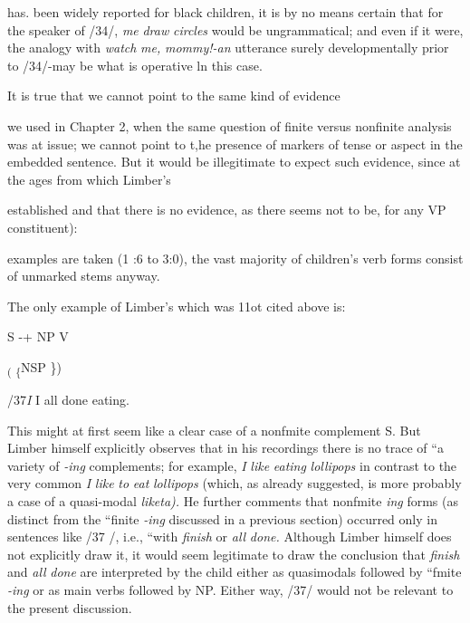 has. been widely reported for black children, it is by no means certain that for the speaker of /34/, \textit{me} \textit{draw} \textit{circles} would be ungrammatical; and even if it were, the analogy with \textit{watch} \textit{me,} \textit{mommy!-an} utterance surely developmentally prior to /34/-may be what is operative ln this case.

It is true that we cannot point to the same kind of evidence


we used in Chapter 2, when the same question of finite versus non\-finite analysis was at issue; we cannot point to t,he presence of markers of tense or aspect in the embedded sentence. But it would be illegiti\-mate to expect such evidence, since at the ages from which Limber's


established and that there is no evidence, as there seems not to be, for any VP constituent):

examples are taken (1 :6 to 3:0), the vast majority of children's verb forms consist of unmarked stems anyway.

The only example of Limber's which was 11ot cited above is:

\ea\label{ex:39}
 S {}-+ NP V
\glt
\z

\textsubscript{( }\textsubscript{\{}NSP \})

/37\textit{I} I all done eating.

This might at first seem like a clear case of a nonf{\textquotedbl}mite complement S. But Limber himself explicitly observes that in his recordings there is no trace of ``a variety of \textit{{}-ing} complements; for example, \textit{I} \textit{like} \textit{eating} \textit{lollipops} in contrast to the very common \textit{I} \textit{like} \textit{to} \textit{eat} \textit{lollipops{\textquotedbl}} (which, as already suggested, is more probably a case of a quasi-modal \textit{liketa).} He further comments that nonf{\textquotedbl}mite \textit{i}\textit{n}\textit{g} forms (as distinct from the ``finite \textit{{}-ing{\textquotedbl}} discussed in a previous section) occurred only in sentences like /37 /, i.e., ``with \textit{finish} or \textit{all} \textit{d}\textit{one.{\textquotedbl}} Although Limber himself does not explicitly draw it, it would seem legitimate to draw the conclusion that \textit{finish} and \textit{all} \textit{done} are interpreted by the child either as quasi\-modals followed by ``fmite \textit{{}-i}\textit{n}\textit{g{\textquotedbl}} or as main verbs followed by NP. Either way, /37/ would not be relevant to the present discussion.


